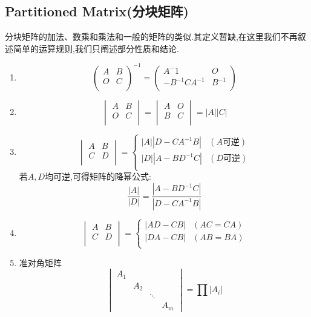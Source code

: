\documentclass[UTF8,a4paper,notitlepage]{book}
\begin{document}
        \subsection{Partitioned Matrix(分块矩阵)}
        分块矩阵的加法、数乘和乘法和一般的矩阵的类似.其定义暂缺,在这里我们不再叙述简单的运算规则,我们只阐述部分性质和结论.
        \begin{corollary}\mbox{}\begin{enumerate}
                \item $$\begin{pmatrix}A&B\\ O&C\\ \end{pmatrix}^{-1}=\begin{pmatrix}A^-1&O\\ -B^{-1}CA^{-1}&B^{-1}\\ \end{pmatrix}$$
                \item $$\begin{vmatrix}A&B\\ O&C\\ \end{vmatrix}=\begin{vmatrix}A&O\\ B&C\\ \end{vmatrix}=|A||C|$$
                \item $$\begin{vmatrix}A&B\\ C&D\\ \end{vmatrix}=\left\{\begin{array}{ll}|A||D-CA^{-1}B|&(A\textrm{可逆})\\ |D||A-BD^{-1}C|&(D\textrm{可逆})\\ \end{array}\right.$$
                    若$A,D$均可逆,可得矩阵的降幂公式:$$\frac{|A|}{|D|}=\frac{|A-BD^{-1}C|}{|D-CA^{-1}B|}$$
                \item $$\begin{vmatrix}A&B\\ C&D\\ \end{vmatrix}=\left\{\begin{array}{ll}|AD-CB|&(AC=CA)\\ |DA-CB|&(AB=BA)\\ \end{array}\right.$$
                \item 准对角矩阵$$\begin{vmatrix}A_1&&&\\ &A_2&&\\ &&\ddots & \\ &&&A_m \end{vmatrix}=\prod |A_i|$$

\end{enumerate}
\end{corollary}
\end{document}
